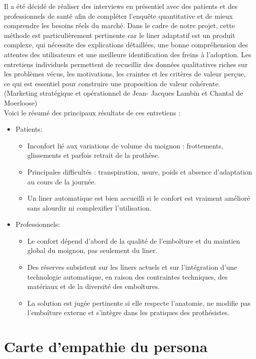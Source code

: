 Il a été décidé de réaliser des interviews en présentiel avec des patients et des professionnels de santé afin de compléter l'enquête quantitative et de mieux comprendre les besoins réels du marché. Dans le cadre de notre projet, cette méthode est particulièrement pertinente car le liner adaptatif est un produit complexe, qui nécessite des explications détaillées, une bonne compréhension des attentes des utilisateurs et une meilleure identification des freins à l'adoption.
Les entretiens individuels permettent de recueillir des données qualitatives riches sur les problèmes vécus, les motivations, les craintes et les critères de valeur perçue, ce qui est essentiel pour construire une proposition de valeur cohérente. (Marketing stratégique et opérationnel de Jean-
Jacques Lambin et Chantal de Moerloose)
\\Voici le résumé des principaux résultats de ces entretiens :
\begin{itemize}
    \item Patients:
    \begin{itemize}
        \item Inconfort lié aux variations de volume du moignon : frottements, glissements et parfois retrait de la prothèse.
        \item Principales difficultés : transpiration, usure, poids et absence d'adaptation au cours de la journée.
        \item Un liner automatique est bien accueilli si le confort est vraiment amélioré sans alourdir ni complexifier l'utilisation.
    \end{itemize}

    \item Professionnels:
    \begin{itemize}
        \item Le confort dépend d'abord de la qualité de l'emboîture et du maintien global du moignon, pas seulement du liner.
        \item Des réserves subsistent sur les liners actuels et sur l'intégration d'une technologie automatique, en raison des contraintes techniques, des matériaux et de la diversité des emboîtures.
        \item La solution est jugée pertinente si elle respecte l'anatomie, ne modifie pas l'emboîture externe et s'intègre dans les pratiques des prothésistes.
    \end{itemize}
\end{itemize}

\section{Carte d'empathie du persona}

